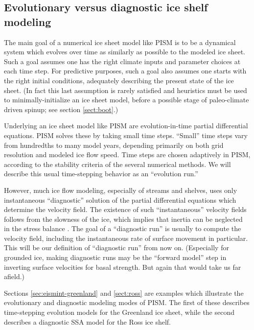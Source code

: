 \documentclass[titlepage,letterpaper,final]{scrartcl}
\begin{document}
\subsection{Evolutionary versus diagnostic ice shelf modeling} \label{subsect:basicmodes}    The main goal of a numerical ice sheet model like PISM is to be a dynamical system which evolves over time as similarly as possible to the modeled ice sheet.  Such a goal assumes one has the right climate inputs and parameter choices at each time step.  For predictive purposes, such a goal also assumes one starts with the right initial conditions, adequately describing the present state of the ice sheet.  (In fact this last assumption is rarely satisfied and heuristics must be used to minimally-initialize an ice sheet model, before a possible stage of paleo-climate driven spinup; see section \ref{sect:boot}.)

Underlying an ice sheet model like PISM are evolution-in-time partial differential equations.  PISM solves these by taking small time steps.  ``Small'' time steps vary from hundredths to many model years, depending primarily on both grid resolution and modeled ice flow speed.  Time steps are chosen adaptively in PISM, according to the stability criteria of the several numerical methods.  We will describe this usual time-stepping behavior as an ``evolution run.''

However, much ice flow modeling, especially of streams and shelves, uses only instantaneous ``diagnostic'' solution of the partial differential equations which determine the velocity field.  The existence of such ``instantaneous'' velocity fields follows from the slowness of the ice, which implies that inertia can be neglected in the stress balance \cite{Fowler}.  The goal of a ``diagnostic run'' is usually to compute the velocity field, including the instantaneous rate of surface movement in particular.  This will be our definition of ``diagnostic run'' from now on.  (Especially for grounded ice, making diagnostic runs may be the ``forward model'' step in inverting surface velocities for basal strength.  But again that would take us far afield.)

Sections \ref{sec:eismint-greenland} and \ref{sect:ross} are examples which illustrate the evolutionary and diagnostic modeling modes of PISM.  The first of these describes time-stepping evolution models for the Greenland ice sheet, while the second describes a diagnostic SSA model for the Ross ice shelf.
\end{document}
